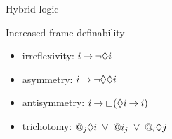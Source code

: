 \documentclass[aspectratio=169]{beamer}
\begin{document}
\begin{slide}{Hybrid logic}\label{s:49}
\small

\begin{block}{Increased frame definability}
\begin{itemize}
\item \alert{irreflexivity}: $i \mathbin{\rightarrow} \neg \Diamond i$\\
\item \alert{asymmetry}: $i \mathbin{\rightarrow} \neg \Diamond \Diamond i$\\
\item \alert{antisymmetry}: $i \mathbin{\rightarrow} \boxempty (\Diamond i \mathbin{\rightarrow} i)$\\
\item \alert{trichotomy}: $@_j \Diamond i\; \lor\; @i_j    \; \lor\;   @_i \Diamond j$
\end{itemize}
\end{block}

\end{slide}





\end{document}
